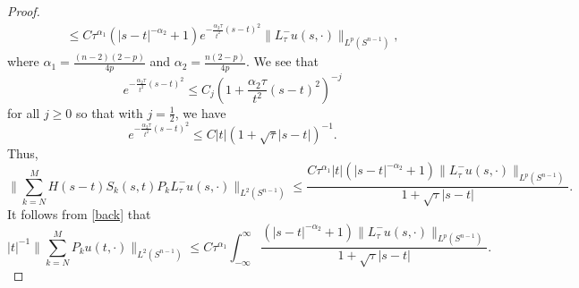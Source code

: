 \documentclass[11pt]{amsart}
\theoremstyle{plain}
\numberwithin{equation}{section}
\begin{document}
\begin{proof}
\begin{eqnarray*}
\leq  C \tau^{\alpha_1} (|s-t|^{-\alpha_2}+1)e^{-\frac{\alpha_2\tau}{t^2}(s-t)^2}\| L^-_\tau u(s, \cdot) \|_{L^p(S^{n-1})},
\end{eqnarray*}
where $\alpha_1=\frac{(n-2)(2-p)}{4p}$ and $\alpha_2=\frac{n(2-p)}{4p}$.
We see that
$$ e^{-\frac{\alpha_2\tau}{t^2}(s-t)^2}\leq C_j {\left( {1+\frac{\alpha_2\tau}{t^2}(s-t)^2} \right) }^{-j}   $$
for all $j\geq 0$ so that with $j=\frac{1}{2}$, we have
\begin{equation}
e^{-\frac{\alpha_2\tau}{t^2}(s-t)^2}\leq C|t|{\left( {1+\sqrt{\tau}|s-t|} \right) }^{-1}.
\label{expBnd}
\end{equation}
Thus,
$$ \|\sum^M_{k=N}H(s-t)S_k(s,t) P_k L^-_\tau u(s,\cdot)\|_{L^2(S^{n-1})}
\leq \frac{C\tau^{\alpha_1}|t|(|s-t|^{-\alpha_2}+1)\| L^-_\tau u(s,
\cdot) \|_{L^p(S^{n-1})}}{1+\sqrt{\tau}|s-t|}.
$$
It follows 
from \eqref{back} that
\begin{equation}
|t|^{-1}\| \sum^M_{k=N} P_k u(t, \cdot)\|_{L^2(S^{n-1})} \leq C
\tau^{\alpha_1} \int_{-\infty}^{\infty}\frac{(|s-t|^{-\alpha_2}+1)\|
L^-_\tau u(s, \cdot) \|_{L^p(S^{n-1})}}{1+\sqrt{\tau}|s-t|}.
\label{mile}
\end{equation}


\end{proof}
\end{document}

